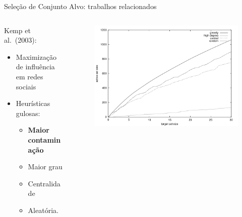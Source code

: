 \documentclass{beamer}
\begin{document}
\begin{frame}{Seleção de Conjunto Alvo: trabalhos relacionados}

\begin{columns}[T]
\begin{column}{.5\textwidth}

Kemp et al.~(2003):

\begin{itemize}
\tightlist
\item
  Maximização de influência em redes sociais
\item
  Heurísticas gulosas:

  \begin{itemize}
  \tightlist
  \item
    {\bf Maior contaminação}
  \item
    Maior grau
  \item
    Centralidade
  \item
    Aleatória.
  \end{itemize}
\end{itemize}
\end{column}
\begin{column}{.5\textwidth}
\centering
\begin{figure}
\centering
\includegraphics[scale=0.2]{img/kemp2003.png}
\end{figure}

\end{column}
\end{columns}

\end{frame}
\end{document}
